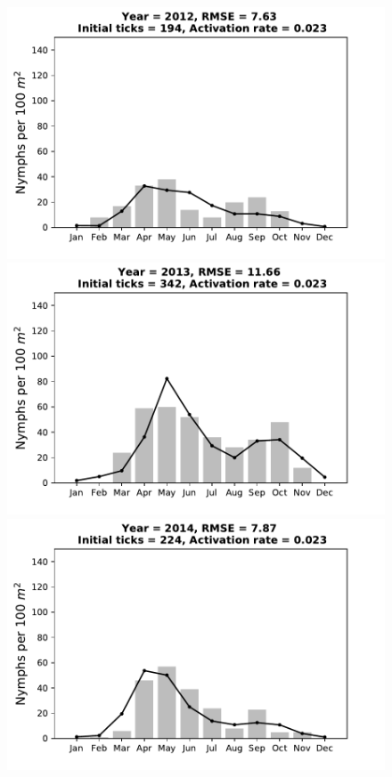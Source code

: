 \documentclass[a4paper, 11pt]{scrartcl}
\begin{document}
\begin{figure}[h!]
\begin{minipage}[c]{0.40\linewidth}
\end{minipage}
\begin{minipage}[c]{0.40\linewidth}
\includegraphics[width=\linewidth]{figures/s1/S1_2012}
\end{minipage}
\begin{minipage}[c]{0.40\linewidth}
\includegraphics[width=\linewidth]{figures/s1/S1_2013}
\end{minipage}
\begin{minipage}[c]{0.40\linewidth}
\includegraphics[width=\linewidth]{figures/s1/S1_2014}

\end{minipage}
\end{figure}
\end{document}
